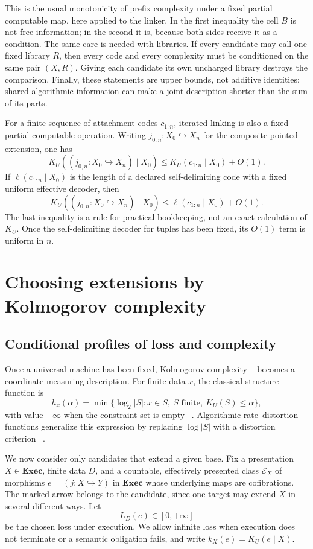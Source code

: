 \documentclass[11pt]{article}
\newcommand{\Exec}{\mathbf{Exec}}
\newcommand{\K}{K_U}
\begin{document}
This is the usual monotonicity of prefix complexity under a fixed partial
computable map, here applied to the linker.  In the first inequality the cell
\(B\) is not free information; in the second it is, because both sides receive
it as a condition.  The same care is needed with libraries.  If every
candidate may call one fixed library \(R\), then every code and every
complexity must be conditioned on the same pair \((X,R)\).  Giving each
candidate its own uncharged library destroys the comparison.  Finally, these
statements are upper bounds, not additive identities: shared algorithmic
information can make a joint description shorter than the sum of its parts.

For a finite sequence of attachment codes \(c_{1:n}\), iterated linking is
also a fixed partial computable operation.  Writing \(j_{0,n}:X_0\hookrightarrow
X_n\) for the composite pointed extension, one has
\[
 \K((j_{0,n}:X_0\hookrightarrow X_n)\mid X_0)
 \le \K(c_{1:n}\mid X_0)+O(1).
\]
If \(\ell(c_{1:n}\mid X_0)\) is the length of a declared self-delimiting code
with a fixed uniform effective decoder, then
\[
 \K((j_{0,n}:X_0\hookrightarrow X_n)\mid X_0)
 \le \ell(c_{1:n}\mid X_0)+O(1).
\]
The last inequality is a rule for practical bookkeeping, not an exact
calculation of \(\K\).  Once the self-delimiting decoder for tuples has been
fixed, its \(O(1)\) term is uniform in \(n\).

\section{Choosing extensions by Kolmogorov complexity}

\subsection{Conditional profiles of loss and complexity}

Once a universal machine has been fixed, Kolmogorov complexity
~\cite{kolmogorov} becomes a coordinate measuring description.  For finite
data \(x\), the classical structure function is
\[
 h_x(\alpha)
 =\min\{\log_2|S|:x\in S,\ S\text{ finite},\ \K(S)\le\alpha\},
\]
with value \(+\infty\) when the constraint set is empty
~\cite{vereshchagin,livitanyi}.  Algorithmic rate--distortion functions
generalize this expression by replacing \(\log |S|\) with a distortion criterion
~\cite{vereshchagin2010}.

We now consider only candidates that extend a given base.  Fix a
presentation \(X\in\Exec\), finite data \(D\), and a countable, effectively
presented class \(\mathcal E_X\) of morphisms
\(e=(j:X\hookrightarrow Y)\) in \(\Exec\) whose underlying maps are
cofibrations.  The marked arrow belongs to the candidate, since one target may
extend \(X\) in several different ways.  Let
\[
 L_D(e)\in[0,+\infty]
\]
be the chosen loss under execution.  We allow infinite loss when execution
does not terminate or a semantic obligation fails, and write
\(k_X(e)=\K(e\mid X)\).
\end{document}
